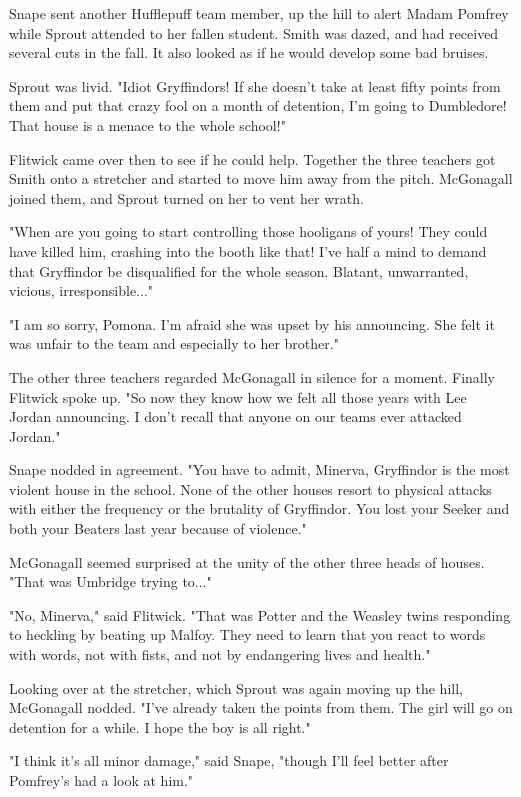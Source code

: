 \documentclass[a4paper,11pt]{article}
\begin{document}
Snape sent another Hufflepuff team member, up the hill to alert Madam Pomfrey while Sprout attended to her fallen student. Smith was dazed, and had received several cuts in the fall. It also looked as if he would develop some bad bruises.

Sprout was livid. "Idiot Gryffindors! If she doesn't take at least fifty points from them and put that crazy fool on a month of detention, I'm going to Dumbledore! That house is a menace to the whole school!"

Flitwick came over then to see if he could help. Together the three teachers got Smith onto a stretcher and started to move him away from the pitch. McGonagall joined them, and Sprout turned on her to vent her wrath.

"When are you going to start controlling those hooligans of yours! They could have killed him, crashing into the booth like that! I've half a mind to demand that Gryffindor be disqualified for the whole season. Blatant, unwarranted, vicious, irresponsible..."

"I am so sorry, Pomona. I'm afraid she was upset by his announcing. She felt it was unfair to the team and especially to her brother."

The other three teachers regarded McGonagall in silence for a moment. Finally Flitwick spoke up. "So now they know how we felt all those years with Lee Jordan announcing. I don't recall that anyone on our teams ever attacked Jordan."

Snape nodded in agreement. "You have to admit, Minerva, Gryffindor is the most violent house in the school. None of the other houses resort to physical attacks with either the frequency or the brutality of Gryffindor. You lost your Seeker and both your Beaters last year because of violence."

McGonagall seemed surprised at the unity of the other three heads of houses. "That was Umbridge trying to..."

"No, Minerva," said Flitwick. "That was Potter and the Weasley twins responding to heckling by beating up Malfoy. They need to learn that you react to words with words, not with fists, and not by endangering lives and health."

Looking over at the stretcher, which Sprout was again moving up the hill, McGonagall nodded. "I've already taken the points from them. The girl will go on detention for a while. I hope the boy is all right."

"I think it's all minor damage," said Snape, "though I'll feel better after Pomfrey's had a look at him."
\end{document}
